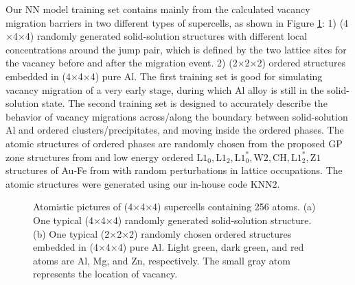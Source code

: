 Our \ac{NN} model training set contains mainly from the calculated vacancy migration barriers in two different types of supercells, as shown in Figure \ref{Chap:Al/Vac:fig:atomic_illu}: 1) (4$\times$4$\times$4) randomly generated solid-solution structures with different local concentrations around the jump pair, which is defined by the two lattice sites for the vacancy before and after the migration event. 2) (2$\times$2$\times$2) ordered structures embedded in (4$\times$4$\times$4) pure Al. The first training set is good for simulating vacancy migration of a very early stage, during which Al alloy is still in the solid-solution state. The second training set is designed to accurately describe the behavior of vacancy migrations across/along the boundary between solid-solution Al and ordered clusters/precipitates, and moving inside the ordered phases. The atomic structures of ordered phases are randomly chosen from the proposed GP zone structures from \cite{berg2001gp} and low energy ordered $\text{L1}_\text{0}, \text{L1}_\text{2}, \text{L1}_\text{0}^*, \text{W2}, \text{CH}, \text{L1}_\text{2}^*, \text{Z1}$ structures of Au-Fe from \cite{zhuravlev2017phase} with random perturbations in lattice occupations. The atomic structures were generated using our in-house code KNN2\cite{Zhang2020KNN2}. 

\begingroup
\begin{figure}[!ht]
  \centering
\caption[Atomistic pictures of (4$\times$4$\times$4) supercells containing 256 atoms.]{Atomistic pictures of (4$\times$4$\times$4) supercells containing 256 atoms. (a) One typical (4$\times$4$\times$4) randomly generated solid-solution structure. (b) One typical (2$\times$2$\times$2) randomly chosen ordered structures embedded in (4$\times$4$\times$4) pure Al. Light green, dark green, and red atoms are Al, Mg, and Zn, respectively. The small gray atom represents the location of vacancy.}
\label{Chap:Al/Vac:fig:atomic_illu}
\end{figure}
\endgroup


